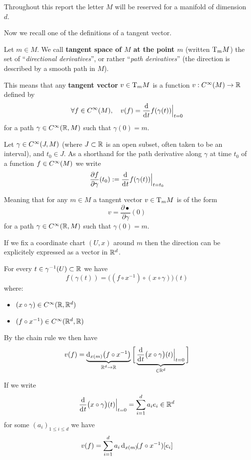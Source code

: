    Throughout this report the letter $M$ will be reserved for a manifold of dimension $d$.

	Now we recall one of the definitions of a tangent vector.

	\begin{definition}
		Let $m \in M$.
		We call \textbf{tangent space of $M$ at the point $m$} (written $\mathrm{T}_m{M}$) the set of ``\emph{directional derivatives}'', or rather ``\emph{path derivatives}'' (the direction is described by a smooth path in $M$).
        
		This means that any \textbf{tangent vector} $v \in \mathrm{T}_m{M}$ is a function $v: C^\infty(M) \to \mathbb{R}$ defined by
		$$
			\forall f \in \Cinf(M), \quad v(f) = \frac{\d}{\di{t}} f(\gamma(t)) \Big|_{t=0}
		$$
		for a path $\gamma \in C^\infty(\mathbb{R}, M)$ such that $\gamma(0) = m$.
	\end{definition}

	\begin{notation}
		Let $\gamma \in C^\infty(J, M)$ (where $J \subset \mathbb{R}$ is an open subset, often taken to be an interval), and $t_0 \in J$.
		As a shorthand for the path derivative along $\gamma$ at time $t_0$ of a function $f \in C^\infty(M)$ we write 
		$$
			\frac{\partial f}{\partial \gamma}(t_0) := \frac{\d}{\di{t}} f(\gamma(t)) \Big|_{t=t_0}
		$$

		Meaning that for any $m \in M$ a tangent vector $v \in \mathrm{T}_m{M}$ is of the form
		$$
			v = \frac{\partial \bullet}{\partial \gamma}(0)
		$$
		for a path $\gamma \in C^\infty(\mathbb{R}, M)$ such that $\gamma(0) = m$.
	\end{notation}

	If we fix a coordinate chart $(U, x)$ around $m$ then the direction can be explicitely expressed as a vector in $\mathbb{R}^d$.

	For every $t \in \gamma^{-1}(U) \subset \mathbb{R}$ we have
	$$
		f(\gamma(t)) = \big( (f \circ x^{-1}) \circ (x \circ \gamma) \big)(t)
	$$
	where:
	\begin{itemize}
		\item $(x \circ \gamma) \in C^\infty(\mathbb{R}, \mathbb{R}^d)$
		\item $(f \circ x^{-1}) \in C^\infty(\mathbb{R}^d, \mathbb{R})$
	\end{itemize}
	By the chain rule we then have
	$$
		v(f) = \underbrace{\di[x(m)] \big( f \circ x^{-1} \big)}_{\R^d \to \R} \bigg[ \underbrace{\frac{\d}{\di{t}} \big( x \circ \gamma \big)(t) \Big|_{t=0}}_{\in \R^d} \bigg]
	$$

	If we write
	$$
		\frac{\d}{\di{t}} \big( x \circ \gamma \big)(t) \Big|_{t=0} = \sum_{i=1}^d a_i e_i \in \R^d
	$$
	for some $(a_i)_{1 \leq i \leq d}$ we have
	$$
		v(f) = \sum_{i=1}^d a_i \di[x(m)](f \circ x^{-1})[e_i]
	$$

